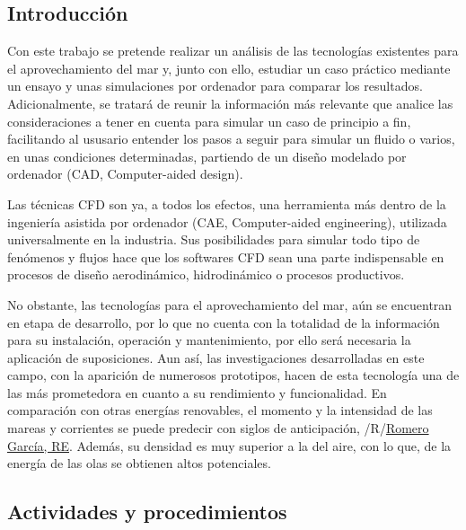 \subsection{Introducción}\label{header-n2}

Con este trabajo se pretende realizar un análisis de las tecnologías
existentes para el aprovechamiento del mar y, junto con ello, estudiar
un caso práctico mediante un ensayo y unas simulaciones por ordenador
para comparar los resultados. Adicionalmente, se tratará de reunir la
información más relevante que analice las consideraciones a tener en
cuenta para simular un caso de principio a fin, facilitando al ususario
entender los pasos a seguir para simular un fluido o varios, en unas
condiciones determinadas, partiendo de un diseño modelado por ordenador
(CAD, Computer-aided design).

Las técnicas CFD son ya, a todos los efectos, una herramienta más dentro
de la ingeniería asistida por ordenador (CAE, Computer-aided
engineering), utilizada universalmente en la industria. Sus
posibilidades para simular todo tipo de fenómenos y flujos hace que los
softwares CFD sean una parte indispensable en procesos de diseño
aerodinámico, hidrodinámico o procesos productivos.

No obstante, las tecnologías para el aprovechamiento del mar, aún se
encuentran en etapa de desarrollo, por lo que no cuenta con la totalidad
de la información para su instalación, operación y mantenimiento, por
ello será necesaria la aplicación de suposiciones. Aun así, las
investigaciones desarrolladas en este campo, con la aparición de
numerosos prototipos, hacen de esta tecnología una de las más
prometedora en cuanto a su rendimiento y funcionalidad. En comparación
con otras energías renovables, el momento y la intensidad de las mareas
y corrientes se puede predecir con siglos de anticipación,
/R/\href{Romero\%20García,RE;\%20\%22Producción\%20de\%20energía\%20eléctrica\%20a\%20partir\%20de\%20los\%20mares\%22;\%20Técnica\%20Industrial;\%20288;\%20Agosto\%202010;\%20pp\%2044-51}{Romero
García, RE}. Además, su densidad es muy superior a la del aire, con lo
que, de la energía de las olas se obtienen altos potenciales.

\subsection{Actividades y procedimientos}\label{header-n9}

